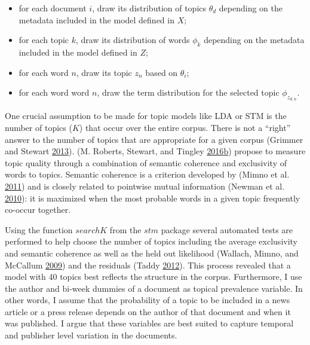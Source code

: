 \documentclass[
]{article}
\providecommand{\tightlist}{%
  \setlength{\itemsep}{0pt}\setlength{\parskip}{0pt}}
\begin{document}
\begin{itemize}
\tightlist
\item
  for each document \(i\), draw its distribution of topics \(\theta_d\)
  depending on the metadata included in the model defined in \(X\);
\item
  for each topic \(k\), draw its distribution of words \(\phi_k\)
  depending on the metadata included in the model defined in \(Z\);
\item
  for each word \(n\), draw its topic \(z_n\) based on \(\theta_i\);
\item
  for each word word \(n\), draw the term distribution for the selected
  topic \(\phi_{z_{d,n}}\).
\end{itemize}

One crucial assumption to be made for topic models like LDA or STM is
the number of topics (\(K\)) that occur over the entire corpus. There is
not a ``right'' answer to the number of topics that are appropriate for
a given corpus (Grimmer and Stewart
\protect\hyperlink{ref-grimmer_text_2013}{2013}). (M. Roberts, Stewart,
and Tingley
\protect\hyperlink{ref-roberts_stm:_2016}{2016}\protect\hyperlink{ref-roberts_stm:_2016}{b})
propose to measure topic quality through a combination of semantic
coherence and exclusivity of words to topics. Semantic coherence is a
criterion developed by (Mimno et al.
\protect\hyperlink{ref-mimno_optimizing_2011}{2011}) and is closely
related to pointwise mutual information (Newman et al.
\protect\hyperlink{ref-newman_automatic_2010}{2010}): it is maximized
when the most probable words in a given topic frequently co-occur
together.

Using the function \(searchK\) from the \(stm\) package several
automated tests are performed to help choose the number of topics
including the average exclusivity and semantic coherence as well as the
held out likelihood (Wallach, Mimno, and McCallum
\protect\hyperlink{ref-wallach_rethinking_2009}{2009}) and the residuals
(Taddy \protect\hyperlink{ref-taddy_estimation_2012}{2012}). This
process revealed that a model with 40 topics best reflects the structure
in the corpus. Furthermore, I use the author and bi-week dummies of a
document as topical prevalence variable. In other words, I assume that
the probability of a topic to be included in a news article or a press
release depends on the author of that document and when it was
published. I argue that these variables are best suited to capture
temporal and publisher level variation in the documents.
\end{document}
